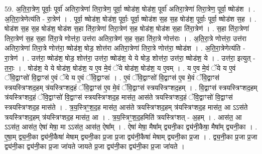 \documentclass[17pt]{extarticle}
\begin{document}
59. अ॒ति॒रा॒त्रेण॒ पूर्वाः॒ पूर्वा॑ अतिरा॒त्रेणा॑ तिरा॒त्रेण॒ पूर्वा॒ ष्षोड॑श॒ षोड॑श॒ पूर्वा॑ अतिरा॒त्रेणा॑ तिरा॒त्रेण॒ पूर्वा॒ ष्षोड॑श । . अ॒ति॒रा॒त्रेणेत्य॑ति - रा॒त्रेण॑ । . पूर्वा॒ ष्षोड॑श॒ षोड॑श॒ पूर्वाः॒ पूर्वा॒ ष्षोड॑श स॒ह स॒ह षोड॑श॒ पूर्वाः॒ पूर्वा॒ ष्षोड॑श स॒ह । . षोड॑श स॒ह स॒ह षोड॑श॒ षोड॑श स॒हा ति॑रा॒त्रेणा॑ तिरा॒त्रेण॑ स॒ह षोड॑श॒ षोड॑श स॒हा ति॑रा॒त्रेण॑ । . स॒हा ति॑रा॒त्रेणा॑ तिरा॒त्रेण॑ स॒ह स॒हा ति॑रा॒त्रे णोत्त॑रा॒ उत्त॑रा अतिरा॒त्रेण॑ स॒ह स॒हा ति॑रा॒त्रे णोत्त॑राः । . अ॒ति॒रा॒त्रे णोत्त॑रा॒ उत्त॑रा अतिरा॒त्रेणा॑ तिरा॒त्रे णोत्त॑रा॒ ष्षोड॑श॒ षोड॒ शोत्त॑रा अतिरा॒त्रेणा॑ तिरा॒त्रे णोत्त॑रा॒ ष्षोड॑श । . अ॒ति॒रा॒त्रेणेत्य॑ति - रा॒त्रेण॑ । . उत्त॑रा॒ ष्षोड॑श॒ षोड॒ शोत्त॑रा॒ उत्त॑रा॒ ष्षोड॑श॒ ये ये षोड॒ शोत्त॑रा॒ उत्त॑रा॒ ष्षोड॑श॒ ये । . उत्त॑रा॒ इत्युत् - त॒राः॒ । . षोड॑श॒ ये ये षोड॑श॒ षोड॑श॒ य ए॒व मे॒वं ॅये षोड॑श॒ षोड॑श॒ य ए॒वम् । . य ए॒व मे॒वं ॅये य ए॒वं ॅवि॒द्वाꣳसो॑ वि॒द्वाꣳस॑ ए॒वं ॅये य ए॒वं ॅवि॒द्वाꣳसः॑ । . ए॒वं ॅवि॒द्वाꣳसो॑ वि॒द्वाꣳस॑ ए॒व मे॒वं ॅवि॒द्वाꣳस॑ स्त्रयस्त्रिꣳशद॒हम् त्र॑यस्त्रिꣳशद॒हं ॅवि॒द्वाꣳस॑ ए॒व मे॒वं ॅवि॒द्वाꣳस॑ स्त्रयस्त्रिꣳशद॒हम् । . वि॒द्वाꣳस॑ स्त्रयस्त्रिꣳशद॒हम् त्र॑यस्त्रिꣳशद॒हं ॅवि॒द्वाꣳसो॑ वि॒द्वाꣳस॑ स्त्रयस्त्रिꣳशद॒ह मास॑त॒ आस॑ते त्रयस्त्रिꣳशद॒हं ॅवि॒द्वाꣳसो॑ वि॒द्वाꣳस॑ स्त्रयस्त्रिꣳशद॒ह मास॑ते । . त्र॒य॒स्त्रिꣳ॒॒श॒द॒ह मास॑त॒ आस॑ते त्रयस्त्रिꣳशद॒हम् त्र॑यस्त्रिꣳशद॒ह मास॑त॒ आ ऽऽस॑ते त्रयस्त्रिꣳशद॒हम् त्र॑यस्त्रिꣳशद॒ह मास॑त॒ आ । . त्र॒य॒स्त्रिꣳ॒॒श॒द॒हमिति॑ त्रयस्त्रिꣳशत् - अ॒हम् । . आस॑त॒ आ ऽऽस॑त॒ आस॑त॒ ऐषा॑ मेषा॒ मा ऽऽस॑त॒ आस॑त॒ ऐषा᳚म् । . ऐषा॑ मेषा॒ मैषा᳚म् द्व्यनी॒का द्व्य॑नी॒कैषा॒ मैषा᳚म् द्व्यनी॒का । . ए॒षा॒म् द्व्य॒नी॒का द्व्य॑नी॒कैषा॑ मेषाम् द्व्यनी॒का प्र॒जा प्र॒जा द्व्य॑नी॒कैषा॑ मेषाम् द्व्यनी॒का प्र॒जा । . द्व्य॒नी॒का प्र॒जा प्र॒जा द्व्य॑नी॒का द्व्य॑नी॒का प्र॒जा जा॑यते जायते प्र॒जा द्व्य॑नी॒का द्व्य॑नी॒का प्र॒जा जा॑यते । \newline
\end{document}
